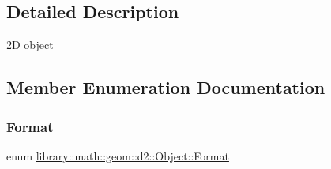 \subsection{Detailed Description}
2D object 

\subsection{Member Enumeration Documentation}
\mbox{\label{classlibrary_1_1math_1_1geom_1_1d2_1_1_object_ac8cd61dada4960cfee9a469231621b17}} 
\subsubsection{\texorpdfstring{Format}{Format}}
{\footnotesize\ttfamily enum \hyperlink{classlibrary_1_1math_1_1geom_1_1d2_1_1_object_ac8cd61dada4960cfee9a469231621b17}{library\+::math\+::geom\+::d2\+::\+Object\+::\+Format}\hspace{0.3cm}{\ttfamily [strong]}}

